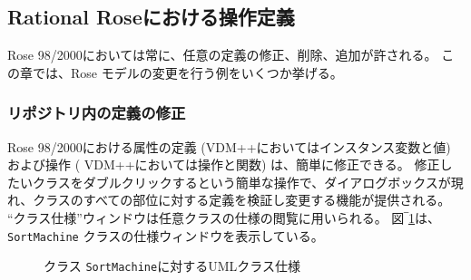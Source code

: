 \documentclass[\pformat,12pt]{jarticle}
\newcommand{\vdmpp}{VDM++}
\newcommand{\rose}{Rose 98/2000}
\begin{document}
\subsection{Rational Roseにおける操作定義} \label{manipulate}
  
\rose{}においては常に、任意の定義の修正、削除、追加が許される。
この章では、Rose モデルの変更を行う例をいくつか挙げる。

\subsubsection*{リポジトリ内の定義の修正}
  
\rose{}における属性の定義 (\vdmpp{}においてはインスタンス変数と値) および操作 ( \vdmpp{}においては操作と関数) は、簡単に修正できる。
修正したいクラスをダブルクリックするという簡単な操作で、ダイアログボックスが現れ、クラスのすべての部位に対する定義を検証し変更する機能が提供される。
``クラス仕様''ウィンドウは任意クラスの仕様の閲覧に用いられる。
図‾\ref{fig:classspecification}は、 {\tt SortMachine} クラスの仕様ウィンドウを表示している。

\begin{figure}[htb]
\begin{center}
\mbox{}
\caption{クラス {\tt SortMachine}に対するUMLクラス仕様　\label{fig:classspecification}}
\end{center}
\end{figure}
\end{document}
